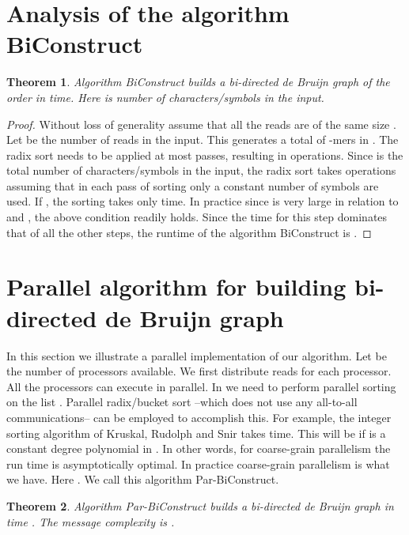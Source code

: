 \documentclass[11pt,conference,twocolumn]{IEEEtran}
\newtheorem{theorem}{Theorem}
\begin{document}
\section{Analysis of the algorithm {\sf BiConstruct}}
\begin{theorem}
Algorithm {\sf BiConstruct} builds a bi-directed de Bruijn graph of the order  in
 time. Here  is number of characters/symbols in the input.
\end{theorem}
\begin{proof}
Without loss of generality assume that all the reads are of the same size . Let  be
the number of reads in the input. This generates a total of  -mers in {\sf [STEP-1]}.
The radix sort needs to be applied at most  passes, resulting in 
operations. Since  is the total number of characters/symbols in the input, the radix sort
takes  operations assuming that in each pass of sorting only a constant number of symbols are used. If , the sorting takes only  time. In practice since  is very large in relation to  and , the above condition readily holds. Since the time for this step dominates that of all the other steps,
the runtime of the algorithm {\sf BiConstruct} is .
\end{proof}

\section{Parallel algorithm for building bi-directed de Bruijn graph}
\label{sec:parallel}
In this section we illustrate a parallel implementation of our algorithm.
Let  be the number of processors available. We first distribute  reads for each processor. All 
the processors can execute {\sf [STEP-1]} in parallel. In {\sf [STEP-2]} we need to perform 
parallel sorting on the list . Parallel radix/bucket sort --which does not use 
any all-to-all communications-- can be employed to accomplish this. For example, the integer sorting algorithm of
Kruskal, Rudolph and Snir takes  time. This will be  if  is
a constant degree polynomial in . In other words, for coarse-grain parallelism the run time is asymptotically
optimal. In practice coarse-grain parallelism is what we have. Here .
We call this algorithm {\sf Par-BiConstruct}. 

\begin{theorem}
Algorithm {\sf Par-BiConstruct} builds a bi-directed de Bruijn graph in time . The message complexity is
.
\end{theorem}
\end{document}
